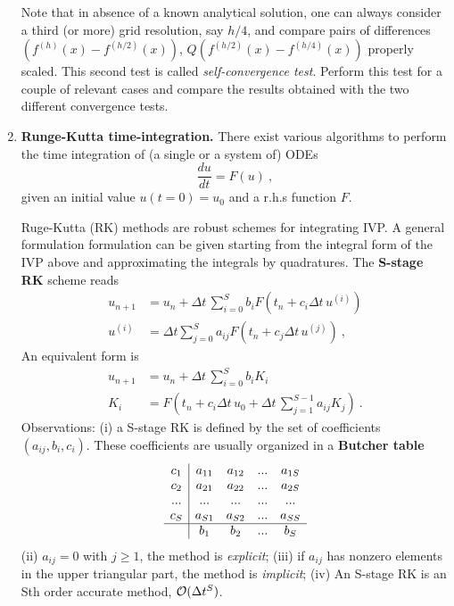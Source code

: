 \begin{enumerate}
    Note that in absence of a known analytical solution, one can
    always consider a third (or more) grid resolution, say $h/4$, and compare
    pairs of differences $(f^{(h)}(x) - f^{(h/2)}(x))$, $Q(f^{(h/2)}(x) -
    f^{(h/4)}(x))$ properly scaled. This second test is called {\it
      self-convergence test}. Perform this test for a couple of relevant
    cases and compare the results obtained with the two different convergence tests.
  \item {\bf Runge-Kutta time-integration.} There exist various
    algorithms to perform the time integration of (a single or a system
    of) ODEs
    \begin{equation}
      \frac{du}{dt} = F(u) \ ,
    \end{equation}
    given an initial value $u(t=0)=u_0$ and a r.h.s function $F$.

    Ruge-Kutta (RK) methods are robust schemes for integrating IVP. A
    general formulation formulation can be given starting from the
    integral form of the IVP above and approximating the integrals by quadratures. 
    The {\bf S-stage RK} scheme reads 
    \begin{subequations}
      \begin{align}
        u_{n+1} &= u_n + \Delta t\, \sum_{i=0}^S b_i F(t_n + c_i\Delta t\, u^{(i)})\\
        u^{(i)} &= \Delta t\sum_{j=0}^S a_{ij}F(t_n+c_j\Delta t\, u^{(j)}) \ ,
      \end{align}
    \end{subequations}
    An equivalent form is
    \begin{subequations}
      \begin{align}
        u_{n+1} &= u_n + \Delta t\, \sum_{i=0}^S b_i K_i\\
        K_i &= F(t_n+c_i\Delta t\, u_0 + \Delta t\, \sum_{j=1}^{S-1} a_{ij}K_j) \ .
      \end{align}
    \end{subequations}
    Observations: (i) a S-stage RK is defined by the set of coefficients
    $(a_{ij},b_i,c_i)$. These coefficients are usually organized in a
  {\bf Butcher table}%
  \begin{equation}
  \begin{array}
    {c|cccc}
    c_1 & a_{11} & a_{12} & ... & a_{1S}\\
    c_2 & a_{21} & a_{22} & ... & a_{2S}\\
    ... & ... & ... & ... & ...\\
    c_S & a_{S1} & a_{S2} &  ... & a_{SS}\\
    \hline
    & b_1 & b_2 & ... & b_S
  \end{array} 
  \end{equation}
  (ii) $a_{ij}=0$ with $j\geq1$, the method is {\it explicit};
  (iii) if $a_{ij}$ has nonzero elements in the upper triangular part,
  the method is {\it implicit};
  (iv) An S-stage RK is an Sth order accurate method, ${\cal O}(\Delta t^S)$.


\end{enumerate}
